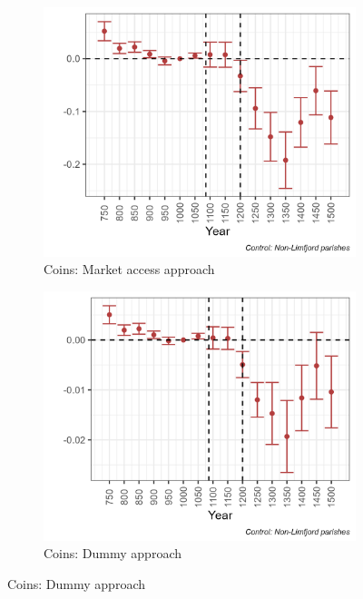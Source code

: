 \documentclass[11pt]{article}
\begin{document}
\begin{figure}
    \centering
    \caption{Archaelogical results}
    \begin{subfigure}[b]{0.45\textwidth}
        \centering
        \caption{Coins: Market access approach} \label{fig:arch1a}
        \includegraphics[width=\textwidth]{Plots/Regression_plots/arch_MA_coins.png}
    \end{subfigure}
    \hfill
    \begin{subfigure}[b]{0.45\textwidth}
        \centering
        \caption{Coins: Dummy approach} \label{fig:arch1b}
        \includegraphics[width=\textwidth]{Plots/Regression_plots/arch_dummy_coins.png}

\end{subfigure}
\end{figure}
\end{document}
